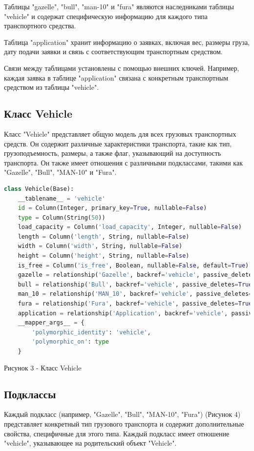 \documentclass[14pt]{extreport}
\begin{document}
    Таблицы "gazelle", "bull", "man-10" и "fura" являются наследниками таблицы "vehicle" и содержат специфическую информацию для каждого типа транспортного средства.

    Таблица "application" хранит информацию о заявках, включая вес, размеры груза, дату подачи заявки и связь с соответствующим транспортным средством.

Связи между таблицами установлены с помощью внешних ключей. Например, каждая заявка в таблице "application" связана с конкретным транспортным средством из таблицы "vehicle".

        \subsection{Класс Vehicle}
        Класс "Vehicle" представляет общую модель для всех грузовых транспортных средств. Он содержит различные характеристики транспорта, такие как тип, грузоподъемность, размеры, а также флаг, указывающий на доступность транспорта. Он также имеет отношения с различными подклассами, такими как "Gazelle", "Bull", "MAN-10" и "Fura".

        \begin{lstlisting}[language=Python]
class Vehicle(Base):
    __tablename__ = 'vehicle'    
    id = Column(Integer, primary_key=True, nullable=False)
    type = Column(String(50))
    load_capacity = Column('load_capacity', Integer, nullable=False)
    length = Column('length', String, nullable=False)
    width = Column('width', String, nullable=False)
    height = Column('height', String, nullable=False)
    is_free = Column('is_free', Boolean, nullable=False, default=True)
    gazelle = relationship('Gazelle', backref='vehicle', passive_deletes=True)
    bull = relationship('Bull', backref='vehicle', passive_deletes=True)
    man_10 = relationship('MAN_10', backref='vehicle', passive_deletes=True)
    fura = relationship('Fura', backref='vehicle', passive_deletes=True)
    application = relationship('Application', backref='vehicle', passive_deletes=True)    
    __mapper_args__ = {
        'polymorphic_identity': 'vehicle',
        'polymorphic_on': type
    }
        \end{lstlisting}
    \begin{center}
        Рисунок 3 - Класс Vehicle 
    \end{center}
    \subsection{Подклассы}
    Каждый подкласс (например, "Gazelle", "Bull", "MAN-10", "Fura") (Рисунок 4) представляет конкретный тип грузового транспорта и содержит дополнительные свойства, специфичные для этого типа. Каждый подкласс имеет отношение "vehicle", указывающее на родительский объект "Vehicle".
\end{document}
